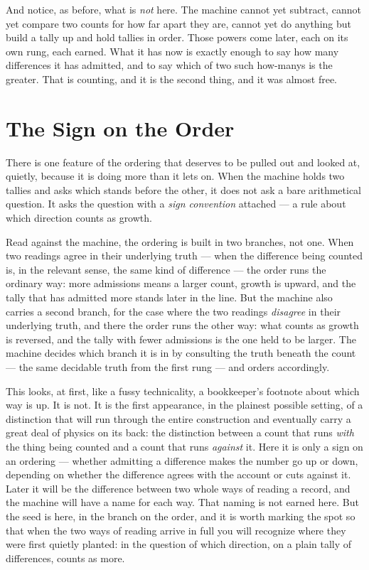 And notice, as before, what is \emph{not} here. The machine cannot yet subtract, cannot yet compare two counts
for how far apart they are, cannot yet do anything but build a tally up and hold tallies in order. Those powers
come later, each on its own rung, each earned. What it has now is exactly enough to say how many differences it
has admitted, and to say which of two such how-manys is the greater. That is counting, and it is the second
thing, and it was almost free.

\section{The Sign on the Order}

There is one feature of the ordering that deserves to be pulled out and looked at, quietly, because it is doing
more than it lets on. When the machine holds two tallies and asks which stands before the other, it does not ask
a bare arithmetical question. It asks the question with a \emph{sign convention} attached --- a rule about which
direction counts as growth.

Read against the machine, the ordering is built in two branches, not one. When two readings agree in their
underlying truth --- when the difference being counted is, in the relevant sense, the same kind of difference ---
the order runs the ordinary way: more admissions means a larger count, growth is upward, and the tally that has
admitted more stands later in the line. But the machine also carries a second branch, for the case where the two
readings \emph{disagree} in their underlying truth, and there the order runs the other way: what counts as growth
is reversed, and the tally with fewer admissions is the one held to be larger. The machine decides which branch
it is in by consulting the truth beneath the count --- the same decidable truth from the first rung --- and
orders accordingly.

This looks, at first, like a fussy technicality, a bookkeeper's footnote about which way is up. It is not. It is
the first appearance, in the plainest possible setting, of a distinction that will run through the entire construction
and eventually carry a great deal of physics on its back: the distinction between a count that runs \emph{with}
the thing being counted and a count that runs \emph{against} it. Here it is only a sign on an ordering ---
whether admitting a difference makes the number go up or down, depending on whether the difference agrees with
the account or cuts against it. Later it will be the difference between two whole ways of reading a record, and
the machine will have a name for each way. That naming is not earned here. But the seed is here, in the branch on
the order, and it is worth marking the spot so that
when the two ways of reading arrive in full you will recognize where they were first quietly planted: in the
question of which direction, on a plain tally of differences, counts as more.

